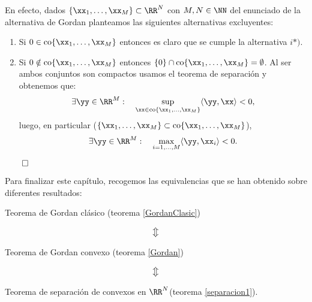 En efecto, dados $ \{\xx_1,\dots, \xx_M \} \subset \RR^N $ con $ M, N \in \NN  $ del enunciado de la alternativa de Gordan planteamos las siguientes alternativas excluyentes:
\begin{enumerate}
\item Si $ 0 \in \mathrm{co}\{\xx_1,\dots, \xx_M \} $ entonces es claro que se cumple la alternativa $ i*) $.
\item Si $ 0 \notin \mathrm{co}\{\xx_1,\dots, \xx_M \} $ entonces $ \{0\} \cap \mathrm{co}\{\xx_1,\dots, \xx_M \} = \emptyset $. Al ser ambos conjuntos son compactos usamos el teorema de separación y obtenemos que:
\[
\exists \yy \in \RR^M: \quad \sup_{\xx \in \mathrm{co}\{\xx_1,\dots, \xx_M \}} \langle \yy, \xx \rangle < 0,
\]
luego, en particular ($ \{\xx_1,\dots, \xx_M \} \subset \mathrm{co}\{\xx_1,\dots, \xx_M \}   $),
\[
\exists \yy \in \RR^M: \quad \max_{i = 1,\dots, M} \langle \yy, \xx_i \rangle < 0.
\]
\end{enumerate}
\begin{flushright}
	$ \qed $
\end{flushright}

\bigskip

Para finalizar este capítulo, recogemos las equivalencias que se han obtenido sobre diferentes resultados:
\begin{center}
	Teorema de Gordan clásico (teorema \ref{GordanClasic})
\end{center}
\[
\big\Updownarrow
\]
\begin{center}
	Teorema de Gordan convexo (teorema \ref{Gordan})
\end{center}
\[
\big\Updownarrow
\]
\begin{center}
	Teorema de separación de convexos en $ \RR^N $(teorema \ref{separacion1}).
\end{center}